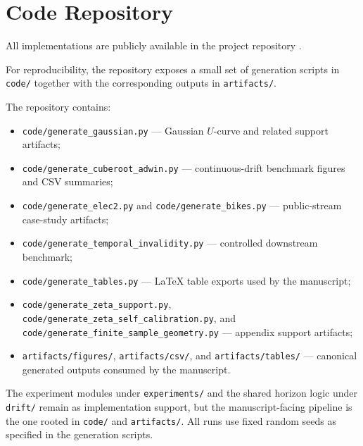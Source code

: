 \section{Code Repository}\label{app:code_repository}

All implementations are publicly available in the project repository
\citep{parreira2026useful_memory_horizon}.

For reproducibility, the repository exposes a small set of generation scripts in
\texttt{code/} together with the corresponding outputs in \texttt{artifacts/}.

The repository contains:
\begin{itemize}[noitemsep]
  \item \texttt{code/generate\_gaussian.py} --- Gaussian $U$-curve and related support artifacts;
  \item \texttt{code/generate\_cuberoot\_adwin.py} --- continuous-drift benchmark figures and CSV summaries;
  \item \texttt{code/generate\_elec2.py} and \texttt{code/generate\_bikes.py} --- public-stream case-study artifacts;
  \item \texttt{code/generate\_temporal\_invalidity.py} --- controlled downstream benchmark;
  \item \texttt{code/generate\_tables.py} --- LaTeX table exports used by the manuscript;
  \item \texttt{code/generate\_zeta\_support.py}, \texttt{code/generate\_zeta\_self\_calibration.py}, and \texttt{code/generate\_finite\_sample\_geometry.py} --- appendix support artifacts;
  \item \texttt{artifacts/figures/}, \texttt{artifacts/csv/}, and \texttt{artifacts/tables/} --- canonical generated outputs consumed by the manuscript.
\end{itemize}

The experiment modules under \texttt{experiments/} and the shared horizon logic
under \texttt{drift/} remain as implementation support, but the
manuscript-facing pipeline is the one rooted in \texttt{code/} and
\texttt{artifacts/}. All runs use fixed random seeds as specified in the
generation scripts.
